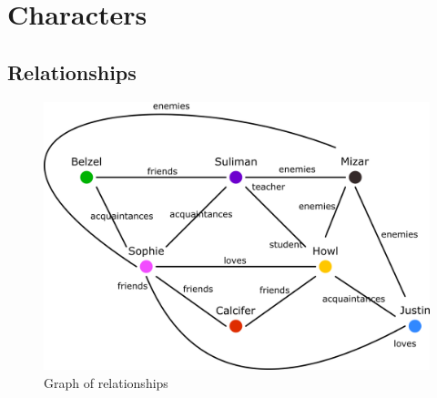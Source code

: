 \chapter{Characters}









\section{Relationships}  
\begin{figure}
  \includegraphics[scale=0.35]{Images/relationships}
  \caption{Graph of relationships}
\end{figure}
